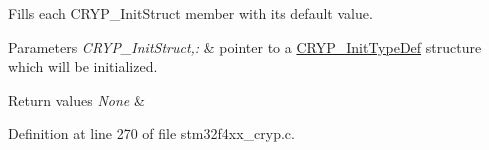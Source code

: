 Fills each C\-R\-Y\-P\-\_\-\-Init\-Struct member with its default value. 


\begin{DoxyParams}{Parameters}
{\em C\-R\-Y\-P\-\_\-\-Init\-Struct,\-:} & pointer to a \hyperlink{struct_c_r_y_p___init_type_def}{C\-R\-Y\-P\-\_\-\-Init\-Type\-Def} structure which will be initialized. \\
\hline
\end{DoxyParams}

\begin{DoxyRetVals}{Return values}
{\em None} & \\
\hline
\end{DoxyRetVals}


Definition at line 270 of file stm32f4xx\-\_\-cryp.\-c.

